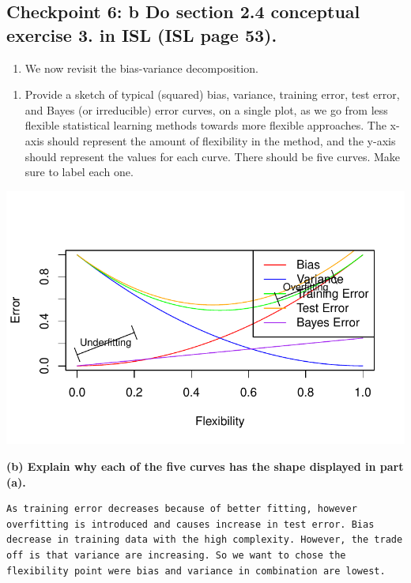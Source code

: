 \documentclass[
  letterpaper,
  DIV=11,
  numbers=noendperiod]{scrartcl}
\providecommand{\tightlist}{%
  \setlength{\itemsep}{0pt}\setlength{\parskip}{0pt}}\usepackage{longtable,booktabs,array}
\begin{document}
\hypertarget{checkpoint-6-b-do-section-2.4-conceptual-exercise-3.-in-isl-isl-page-53.}{%
\subsection{Checkpoint 6: b Do section 2.4 conceptual exercise 3. in ISL
(ISL page
53).}\label{checkpoint-6-b-do-section-2.4-conceptual-exercise-3.-in-isl-isl-page-53.}}

\begin{enumerate}
\def\labelenumi{\arabic{enumi}.}
\setcounter{enumi}{2}
\tightlist
\item
  We now revisit the bias-variance decomposition.
\end{enumerate}

\begin{enumerate}
\def\labelenumi{(\alph{enumi})}
\tightlist
\item
  Provide a sketch of typical (squared) bias, variance, training error,
  test error, and Bayes (or irreducible) error curves, on a single plot,
  as we go from less flexible statistical learning methods towards more
  flexible approaches. The x-axis should represent the amount of
  flexibility in the method, and the y-axis should represent the values
  for each curve. There should be five curves. Make sure to label each
  one.
\end{enumerate}

\includegraphics{excercise_doc_files/figure-pdf/unnamed-chunk-4-1.pdf}

\textbf{(b) Explain why each of the five curves has the shape displayed
in part (a).}

\begin{verbatim}
As training error decreases because of better fitting, however overfitting is introduced and causes increase in test error. Bias decrease in training data with the high complexity. However, the trade off is that variance are increasing. So we want to chose the flexibility point were bias and variance in combination are lowest.
\end{verbatim}
\end{document}
